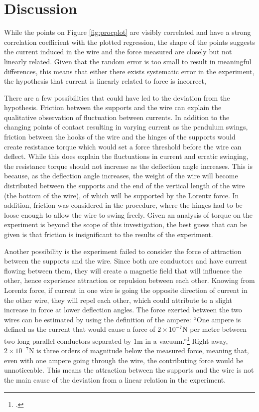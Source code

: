 \section*{Discussion}

While the points on Figure \ref{fig:procplot} are visibly correlated and have a strong correlation coefficient with the plotted regression, the shape of the points suggests the current induced in the wire and the force measured are closely but not linearly related.
Given that the random error is too small to result in meaningful differences, this means that either there exists systematic error in the experiment, the hypothesis that current is linearly related to force is incorrect, 

There are a few possibilities that could have led to the deviation from the hypothesis.
Friction between the supports and the wire can explain the qualitative observation of fluctuation between currents.
In addition to the changing points of contact resulting in varying current as the pendulum swings, friction between the hooks of the wire and the hinges of the supports would create resistance torque which would set a force threshold before the wire can deflect.
While this does explain the fluctuations in current and erratic swinging, the resistance torque should not increase as the deflection angle increases.
This is because, as the deflection angle increases, the weight of the wire will become distributed between the supports and the end of the vertical length of the wire (the bottom of the wire), of which will be supported by the Lorentz force.
In addition, friction was considered in the procedure, where the hinges had to be loose enough to allow the wire to swing freely.
Given an analysis of torque on the experiment is beyond the scope of this investigation, the best guess that can be given is that friction is insignificant to the results of the experiment.

Another possibility is the experiment failed to consider the force of attraction between the supports and the wire.
Since both are conductors and have current flowing between them, they will create a magnetic field that will influence the other, hence experience attraction or repulsion between each other.
Knowing from Lorentz force, if current in one wire is going the opposite direction of current in the other wire, they will repel each other, which could attribute to a slight increase in force at lower deflection angles.
The force exerted between the two wires can be estimated by using the definition of the ampere:
``One ampere is defined as the current that would cause a force of $2 \times 10^{-7}\si{\newton}$ per metre between two long parallel conductors separated by $1\si{\meter}$ in a vacuum.''\footcite{pearsonamp}
Right away, $2 \times 10^{-7}\si{\newton}$ is three orders of magnitude below the measured force, meaning that, even with one ampere going through the wire, the contributing force would be unnoticeable.
This means the attraction between the supports and the wire is not the main cause of the deviation from a linear relation in the experiment.

